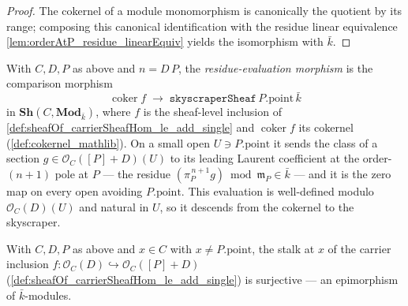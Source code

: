\begin{proof}
  \leanok
  The cokernel of a module monomorphism is canonically the quotient by its
  range; composing this canonical identification with the residue linear
  equivalence \cref{lem:orderAtP_residue_linearEquiv} yields the isomorphism
  with \(\bar k\).
\end{proof}

\begin{definition}
  \label{def:cokernel_skyscraper_hom}
  With \(C, D, P\) as above and \(n = D\,P\), the \emph{residue-evaluation
  morphism} is the comparison morphism
  \[
    \operatorname{coker} f \;\longrightarrow\;
    \texttt{skyscraperSheaf}\,P.\mathrm{point}\,\bar k
  \]
  in \(\mathbf{Sh}(C, \mathbf{Mod}_{\bar k})\), where \(f\) is the sheaf-level
  inclusion of \cref{def:sheafOf_carrierSheafHom_le_add_single} and
  \(\operatorname{coker} f\) its cokernel (\cref{def:cokernel_mathlib}). On a
  small open \(U \ni P.\mathrm{point}\) it sends the class of a section
  \(g \in \mathcal O_C([P]+D)(U)\) to its leading Laurent coefficient at the
  order-\((n+1)\) pole at \(P\) --- the residue
  \((\pi_P^{\,n+1} g) \bmod \mathfrak m_P \in \bar k\) --- and it is the zero map
  on every open avoiding \(P.\mathrm{point}\). This evaluation is well-defined
  modulo \(\mathcal O_C(D)(U)\) and natural in \(U\), so it descends from the
  cokernel to the skyscraper.
\end{definition}

\begin{lemma}

  \label{lem:stalkFunctor_map_carrierPresheaf_le_hom_epi_of_ne}
  With \(C, D, P\) as above and \(x \in C\) with \(x \neq P.\mathrm{point}\), the
  stalk at \(x\) of the carrier inclusion
  \(f : \mathcal O_C(D) \hookrightarrow \mathcal O_C([P]+D)\)
  (\cref{def:sheafOf_carrierSheafHom_le_add_single}) is surjective --- an
  epimorphism of \(\bar k\)-modules.
\end{lemma}

